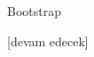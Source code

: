 \documentclass[12pt,fleqn]{article}\usepackage{../../common}
\begin{document}
Bootstrap


















[devam edecek]
\end{document}
